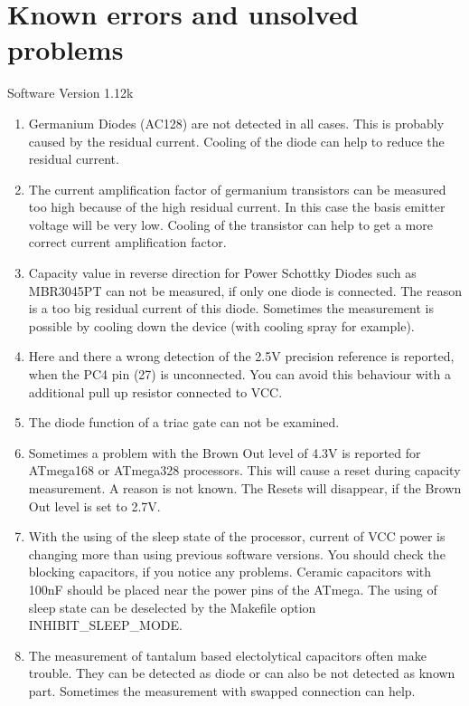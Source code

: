 
\chapter{Known errors and unsolved problems}
{\center Software Version 1.12k}

\begin{enumerate}

\item Germanium Diodes (AC128) are not detected in all cases. This is probably caused by the residual current.
Cooling of the diode can help to reduce the residual current.

\item The current amplification factor of germanium transistors can be measured too high because of
the high residual current. In this case the basis emitter voltage will be very low.
Cooling of the transistor can help to get a more correct current amplification factor.

\item Capacity value in reverse direction for Power Schottky Diodes such as MBR3045PT can not be measured,
if only one diode is connected. The reason is a too big residual current of this diode.
Sometimes the measurement is possible by cooling down the device (with  cooling spray for example).

\item Here and there  a wrong detection of the 2.5V precision reference is reported, when the PC4 pin (27) is unconnected.
You can avoid this behaviour with a additional pull up resistor connected to VCC.

\item The diode function of a triac gate can not be examined.

\item Sometimes a problem with the Brown Out level of 4.3V is reported for ATmega168 or ATmega328 processors.
This will cause a reset during capacity measurement. A reason is not known.
The Resets will disappear, if the Brown Out level is set to 2.7V.

\item With the using of the sleep state of the processor, current of VCC power is changing more than 
using previous software versions.
You should check the blocking capacitors, if you notice any problems.
Ceramic capacitors with 100nF should be placed near the power pins of the ATmega. 
The using of sleep state can be deselected by the Makefile option INHIBIT\_SLEEP\_MODE.

\item The measurement of tantalum based electolytical capacitors often make trouble.
They can be detected as diode or can also be not detected as known part.
Sometimes the measurement with swapped connection can help.


\end{enumerate}
